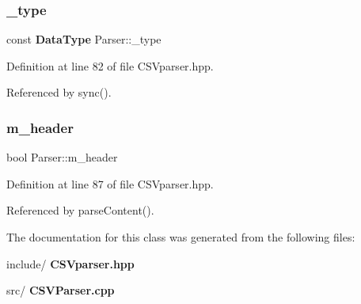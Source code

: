 \mbox{\label{class_parser_a40e8d80f6539cd6170a25d47b9edb20c}} 
\subsubsection{\_type}
{\footnotesize\ttfamily const \textbf{ Data\+Type} Parser\+::\+\_\+type\hspace{0.3cm}{\ttfamily [private]}}



Definition at line 82 of file C\+S\+Vparser.\+hpp.



Referenced by sync().

\mbox{\label{class_parser_ab0bd343f86055468eb6cbd298dacdc16}} 
\subsubsection{m\_header}
{\footnotesize\ttfamily bool Parser\+::m\+\_\+header\hspace{0.3cm}{\ttfamily [private]}}



Definition at line 87 of file C\+S\+Vparser.\+hpp.



Referenced by parse\+Content().



The documentation for this class was generated from the following files\+:\begin{DoxyCompactItemize}
\item 
include/\textbf{ C\+S\+Vparser.\+hpp}\item 
src/\textbf{ C\+S\+V\+Parser.\+cpp}\end{DoxyCompactItemize}
